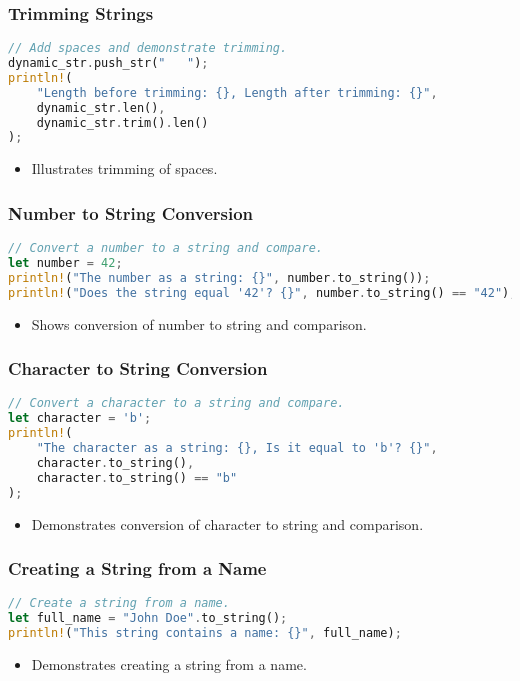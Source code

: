 \documentclass[aspectratio=169, table]{beamer}
\begin{document}
\begin{frame}[fragile]
\frametitle{Trimming Strings}
\begin{lstlisting}[language=Rust]
// Add spaces and demonstrate trimming.
dynamic_str.push_str("   ");
println!(
	"Length before trimming: {}, Length after trimming: {}",
	dynamic_str.len(),
	dynamic_str.trim().len()
);
\end{lstlisting}
\begin{itemize}
	\item Illustrates trimming of spaces.
\end{itemize}
\end{frame}


\begin{frame}[fragile]
\frametitle{Number to String Conversion}
\begin{lstlisting}[language=Rust]
// Convert a number to a string and compare.
let number = 42;
println!("The number as a string: {}", number.to_string());
println!("Does the string equal '42'? {}", number.to_string() == "42");
\end{lstlisting}
\begin{itemize}
\item Shows conversion of number to string and comparison.
\end{itemize}
\end{frame}

\begin{frame}[fragile]
\frametitle{Character to String Conversion}
\begin{lstlisting}[language=Rust]
// Convert a character to a string and compare.
let character = 'b';
println!(
	"The character as a string: {}, Is it equal to 'b'? {}",
	character.to_string(),
	character.to_string() == "b"
);
\end{lstlisting}
\begin{itemize}
	\item Demonstrates conversion of character to string and comparison.
\end{itemize}
\end{frame}


\begin{frame}[fragile]
\frametitle{Creating a String from a Name}
\begin{lstlisting}[language=Rust]
// Create a string from a name.
let full_name = "John Doe".to_string();
println!("This string contains a name: {}", full_name);
\end{lstlisting}
\begin{itemize}
	\item Demonstrates creating a string from a name.
\end{itemize}
\end{frame}
\end{document}
